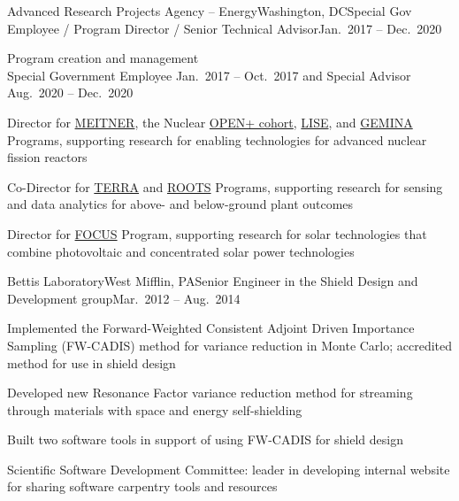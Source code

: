 \begin{rSubsection}{Advanced Research Projects Agency -- Energy}{Washington, DC}{Special Gov Employee / Program Director / Senior Technical Advisor}{Jan.\ 2017 -- Dec.\ 2020}
\item Program creation and management\\
Special Government Employee Jan.\ 2017 --
Oct.\ 2017 and Special Advisor Aug.\ 2020 -- Dec.\ 2020
\item Director for
\href{https://arpa-e.energy.gov/?q=arpa-e-programs/meitner}{MEITNER}, the
Nuclear
\href{https://arpa-e.energy.gov/?q=news-item/arpa-e-announces-12-million-five-projects-nuclear-materials-science}{OPEN+
cohort},
\href{https://arpa-e.energy.gov/?q=news-item/arpa-e-innovating-through-unconventional-ideas}{LISE}, and  \href{https://arpa-e.energy.gov/?q=workshop/optimal-operations-advanced-nuclear-reactors}{GEMINA} Programs, supporting research for enabling technologies for advanced nuclear fission reactors
\item Co-Director for \href{https://arpa-e.energy.gov/?q=arpa-e-programs/terra}{TERRA} and \href{https://arpa-e.energy.gov/?q=arpa-e-programs/roots}{ROOTS} Programs, supporting research for sensing and data analytics for above- and below-ground plant outcomes
\item Director for \href{https://arpa-e.energy.gov/?q=arpa-e-programs/focus}{FOCUS} Program, supporting research for solar technologies that combine photovoltaic and concentrated solar power technologies
\end{rSubsection}



\begin{rSubsection}{Bettis Laboratory}{West Mifflin, PA}{Senior Engineer in the Shield Design and Development group}{Mar.\ 2012 -- Aug.\ 2014}
\item Implemented the Forward-Weighted Consistent Adjoint Driven Importance Sampling (FW-CADIS) method for variance reduction in Monte Carlo; accredited method for use in shield design
\item Developed new Resonance Factor variance reduction method for streaming through materials with space and energy self-shielding
\item Built two software tools in support of using FW-CADIS for shield design
\item Scientific Software Development Committee: leader in developing internal website for sharing software carpentry tools and resources
\end{rSubsection}

